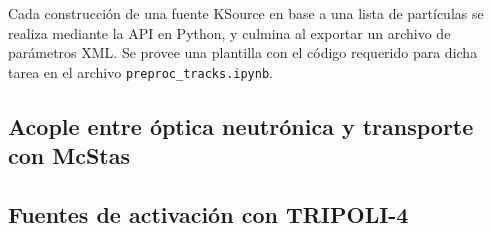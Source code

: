 Cada construcción de una fuente KSource en base a una lista de partículas se realiza mediante la API en Python, y culmina al exportar un archivo de parámetros XML. Se provee una plantilla con el código requerido para dicha tarea en el archivo \verb|preproc_tracks.ipynb|.

\subsection{Acople entre óptica neutrónica y transporte con McStas}

\subsection{Fuentes de activación con TRIPOLI-4}